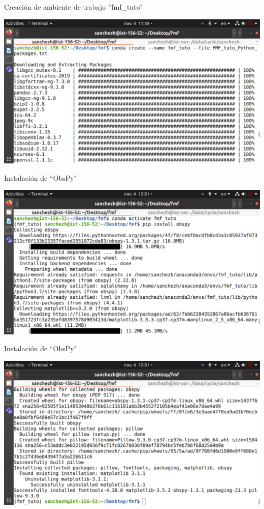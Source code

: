 \documentclass{beamer}
\begin{document}
\begin{frame}
{Creaci\'on de ambiente de trabajo ''fmf\_tuto"}

 \centering
 \includegraphics[width=1\linewidth]{images/conda_create_fmf.png}
 
\end{frame}

\begin{frame}
 {Instalaci\'on de ``ObsPy"}
 
 \centering
 \includegraphics[width=1\linewidth]{images/conda_activate_fmf_install_obspy.png}
 
\end{frame}

\begin{frame}
 {Instalaci\'on de ``ObsPy"}
 
 \centering
 \includegraphics[width=1\linewidth]{images/succes_install_obspy.png}
 
\end{frame}
\end{document}
